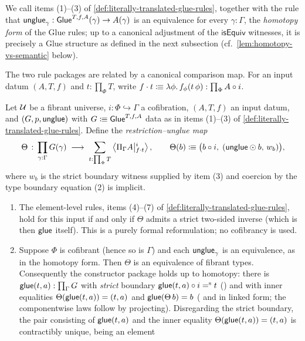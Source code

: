 We call items (1)--(3) of \cref{def:literally-translated-glue-rules},
together with the rule that
$\unglue_\gamma:\Glue^{T,f,A}(\gamma)\to A(\gamma)$ is an equivalence for
every $\gamma:\Gamma$, the \emph{homotopy form} of the Glue rules; up to a
canonical adjustment of the $\mathsf{isEquiv}$ witnesses, it is precisely a
Glue structure as defined in the next subsection (cf.~\cref{lem:homotopy-vs-semantic} below).



The two rule packages are related by a canonical comparison map. For an
input datum $(A,T,f)$ and $t:\prod_\Phi T$, write
$f\cdot t\colonequiv\lambda\phi.\,f_\phi(t\,\phi):\prod_\Phi A\circ i$.

\begin{lemma}\label{lem:constructor-package}
	Let $\UU$ be a fibrant universe, $i:\Phi\hookrightarrow\Gamma$ a cofibration, $(A,T,f)$ an input datum, and
	$(G,p,\unglue)$ with $G\colonequiv\Glue^{T,f,A}$ data as in items
	(1)--(3) of \cref{def:literally-translated-glue-rules}. Define the
	\emph{restriction--unglue map}
	\[
		\Theta \,:\, \prod_{\gamma:\Gamma}G(\gamma)
		\;\longrightarrow\;
		\sum_{t:\prod_\Phi T}\Ext{i}{\Pi_\Gamma A}{f\cdot t},
		\qquad
		\Theta(b)\colonequiv\bigl(b\circ i,\;(\unglue\odot b,\,w_b)\bigr),
	\]
	where $w_b$ is the strict boundary witness supplied by item (3) and coercion by the type boundary equation (2) is implicit.
	\begin{enumerate}
		\item The element-level rules, items (4)--(7) of
		\cref{def:literally-translated-glue-rules}, hold for this input
		if and only if $\Theta$ admits a strict two-sided inverse (which is
		then $\glue$ itself). This is a purely formal reformulation; no
		cofibrancy is used.
		\item Suppose $\Phi$ is cofibrant (hence so is $\Gamma$) and each
		$\unglue_\gamma$ is an equivalence, as in the homotopy form. Then
		$\Theta$ is an equivalence
		of fibrant types. Consequently the constructor package holds up to
		homotopy: there is $\glue(t,a):\prod_\Gamma G$ with \emph{strict}
		boundary $\glue(t,a)\circ i\seq t$ () and with
		inner equalities $\Theta(\glue(t,a))=(t,a)$ and $\glue(\Theta\,b)=b$
		( and  in linked form; the
		componentwise laws follow by projecting). Disregarding the strict
		boundary, the pair consisting of $\glue(t,a)$ and the inner equality
		$\Theta(\glue(t,a))=(t,a)$ is contractibly unique, being an element

\end{enumerate}
\end{lemma}

